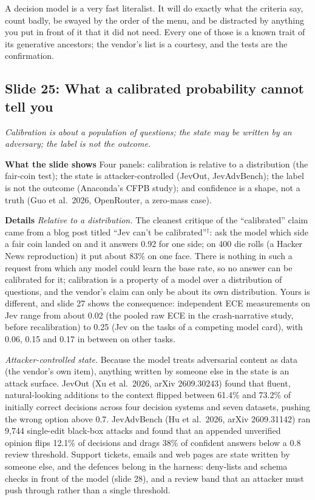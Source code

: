 \documentclass[11pt,letterpaper]{article}
\newcommand{\slide}[3]{%
  \subsection[Slide #1: #2]{Slide #1: #2}%
  {\color{muted}\itshape #3\par}\medskip}
\newcommand{\para}[1]{\medskip\noindent\textbf{#1}\quad}
\newenvironment{intuition}{\begin{tcolorbox}[intuitionbox]}{\end{tcolorbox}}
\begin{document}
\begin{intuition}
A decision model is a very fast literalist. It will do exactly what the criteria say, count badly, be swayed by the order of the menu, and be distracted by anything you put in front of it that it did not need. Every one of those is a known trait of its generative ancestors; the vendor's list is a courtesy, and the tests are the confirmation.
\end{intuition}

\slide{25}{What a calibrated probability cannot tell you}{Calibration is about a population of questions; the state may be written by an adversary; the label is not the outcome.}

\para{What the slide shows} Four panels: calibration is relative to a distribution (the fair-coin test); the state is attacker-controlled (JevOut, JevAdvBench); the label is not the outcome (Anaconda's CFPB study); and confidence is a shape, not a truth (Guo et al.\ 2026, OpenRouter, a zero-mass case).

\para{Details} \emph{Relative to a distribution.} The cleanest critique of the ``calibrated'' claim came from a blog post titled ``Jev can't be calibrated''$^\dagger$: ask the model which side a fair coin landed on and it answers 0.92 for one side; on 400 die rolls (a Hacker News reproduction) it put about 83\% on one face. There is nothing in such a request from which any model could learn the base rate, so no answer can be calibrated for it; calibration is a property of a model over a distribution of questions, and the vendor's claim can only be about its own distribution. Yours is different, and slide 27 shows the consequence: independent ECE measurements on Jev range from about 0.02 (the pooled raw ECE in the crash-narrative study, before recalibration) to 0.25 (Jev on the tasks of a competing model card), with 0.06, 0.15 and 0.17 in between on other tasks.

\emph{Attacker-controlled state.} Because the model treats adversarial content as data (the vendor's own item), anything written by someone else in the state is an attack surface. JevOut (Xu et al.\ 2026, arXiv 2609.30243) found that fluent, natural-looking additions to the context flipped between 61.4\% and 73.2\% of initially correct decisions across four decision systems and seven datasets, pushing the wrong option above 0.7. JevAdvBench (Hu et al.\ 2026, arXiv 2609.31142) ran 9,744 single-edit black-box attacks and found that an appended unverified opinion flips 12.1\% of decisions and drags 38\% of confident answers below a 0.8 review threshold. Support tickets, emails and web pages are state written by someone else, and the defences belong in the harness: deny-lists and schema checks in front of the model (slide 28), and a review band that an attacker must push through rather than a single threshold.
\end{document}
